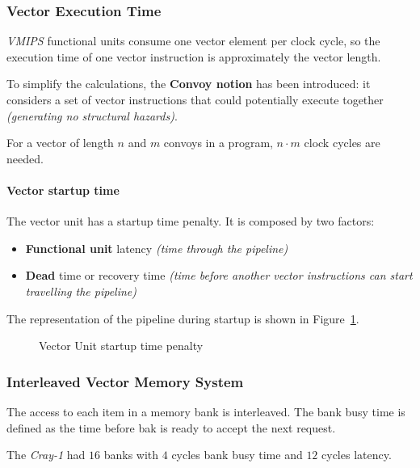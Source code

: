 \documentclass[english]{article}
\begin{document}
\subsubsection{Vector Execution Time}

\textit{VMIPS} functional units consume one vector element per clock cycle, so the execution time of one vector instruction is approximately the vector length.

To simplify the calculations, the \textbf{Convoy notion} has been introduced:
it considers a set of vector instructions that could potentially execute together \textit{(generating no structural hazards)}.

For a vector of length \(n\) and \(m\) convoys in a program, \(n \cdot m\) clock cycles are needed.

\paragraph{Vector startup time}

The vector unit has a startup time penalty.
It is composed by two factors:

\begin{itemize}
  \item \textbf{Functional unit} latency \textit{(time through the pipeline)}
  \item \textbf{Dead} time or recovery time \textit{(time before another vector instructions can start travelling the pipeline)}
\end{itemize}

The representation of the pipeline during startup is shown in Figure~\ref{fig:vector-unit-startup}.

\begin{figure}[htbp]
  \bigskip
  \centering
  \caption{Vector Unit startup time penalty}
  \label{fig:vector-unit-startup}
  \bigskip
\end{figure}

\subsubsection{Interleaved Vector Memory System}

The access to each item in a memory bank is interleaved.
The bank busy time is defined as the time before bak is ready to accept the next request.

The \textit{Cray-1} had \(16\) banks with \(4\) cycles bank busy time and \(12\) cycles latency.
\end{document}
